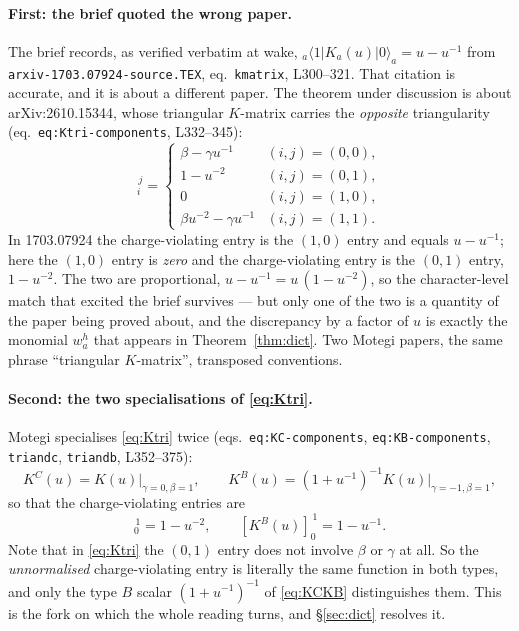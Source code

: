 \documentclass[11pt]{article}
\theoremstyle{plain}
\theoremstyle{definition}
\theoremstyle{remark}
\theoremstyle{plain}
\begin{document}
\paragraph{First: the brief quoted the wrong paper.}
The brief records, as verified verbatim at wake,
${}_a\langle1|K_a(u)|0\rangle_a=u-u^{-1}$ from
\texttt{arxiv-1703.07924-source.TEX}, eq.\ \texttt{kmatrix}, L300--321.  That
citation is accurate, and it is about a different paper.  The theorem under
discussion is about arXiv:2610.15344, whose triangular $K$-matrix carries the
\emph{opposite} triangularity (eq.\ \texttt{eq:Ktri-components}, L332--345):
\begin{equation}
[K(u)]_i^{\,j}=
\begin{cases}
\beta-\gamma u^{-1} & (i,j)=(0,0),\\
1-u^{-2}            & (i,j)=(0,1),\\
0                   & (i,j)=(1,0),\\
\beta u^{-2}-\gamma u^{-1} & (i,j)=(1,1).
\end{cases}
\label{eq:Ktri}
\end{equation}
In 1703.07924 the charge-violating entry is the $(1,0)$ entry and equals
$u-u^{-1}$; here the $(1,0)$ entry is \emph{zero} and the charge-violating entry
is the $(0,1)$ entry, $1-u^{-2}$.  The two are proportional,
$u-u^{-1}=u\,(1-u^{-2})$, so the character-level match that excited the brief
survives --- but only one of the two is a quantity of the paper being proved
about, and the discrepancy by a factor of $u$ is exactly the monomial $w_a^h$
that appears in Theorem~\ref{thm:dict}.  Two Motegi papers, the same phrase
``triangular $K$-matrix'', transposed conventions.

\paragraph{Second: the two specialisations of \eqref{eq:Ktri}.}
Motegi specialises \eqref{eq:Ktri} twice
(eqs.\ \texttt{eq:KC-components}, \texttt{eq:KB-components}, \texttt{triandc},
\texttt{triandb}, L352--375):
\begin{equation}
K^C(u)=K(u)\big|_{\gamma=0,\beta=1},
\qquad
K^B(u)=(1+u^{-1})^{-1}K(u)\big|_{\gamma=-1,\beta=1},
\label{eq:KCKB}
\end{equation}
so that the charge-violating entries are
\begin{equation}
[K^C(u)]_0^{\,1}=1-u^{-2},
\qquad
[K^B(u)]_0^{\,1}=1-u^{-1}.
\label{eq:Kentries}
\end{equation}
Note that in \eqref{eq:Ktri} the $(0,1)$ entry does not involve $\beta$ or
$\gamma$ at all.  So the \emph{unnormalised} charge-violating entry is literally
the same function in both types, and only the type $B$ scalar $(1+u^{-1})^{-1}$
of \eqref{eq:KCKB} distinguishes them.  This is the fork on which the whole
reading turns, and \S\ref{sec:dict} resolves it.
\end{document}
